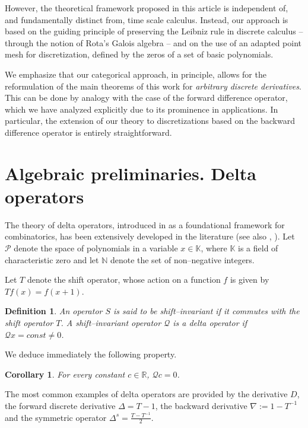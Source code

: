 \documentclass[10pt]{amsart}
\numberwithin{equation}{section}
\newtheorem{definition}{Definition}
\newtheorem{corollary}{Corollary}
\theoremstyle{definition}
\begin{document}
However, the theoretical framework proposed in this article is independent
of, and fundamentally distinct from, time scale calculus. Instead, our
approach is based on the guiding principle of preserving the Leibniz rule
in discrete calculus -- through the notion of Rota's Galois algebra -- and
on the use of an adapted point mesh for discretization, defined by the
zeros of a set of basic polynomials.

We emphasize that our categorical approach, in principle, allows for the reformulation of the main theorems of this work for
\textit{arbitrary discrete derivatives}. This can be done by analogy with
the case of the forward difference operator, which we have analyzed explicitly
due to its prominence in applications. In particular, the extension of
our theory to discretizations based on the backward difference operator
is entirely straightforward.

\section{Algebraic preliminaries. Delta operators}
\label{sec2}

The theory of delta operators, introduced in \cite{Rota} as a foundational
framework for combinatorics, has been extensively developed in the literature
(see also \cite{RR}, \cite{Roman}). Let $\mathcal{P}$ denote the space
of polynomials in a variable $x\in \mathbb{K}$, where $\mathbb{K}$ is a
field of characteristic zero and let $\mathbb{N}$ denote the set of non--negative
integers.

Let $T$ denote the shift operator, whose action on a function $f$ is given
by $T f\left (x\right )=f\left (x+1\right )$.

\begin{definition}
\label{deltaop}
An operator $S$ is said to be \textit{shift--invariant} if it commutes with
the shift operator $T$. A shift--invariant operator $\mathcal{Q}$ is a
\textit{delta operator} if $\mathcal{Q} x=const\neq 0$.
\end{definition}
We deduce immediately the following property.
\begin{corollary}
\label{cor1}
For every constant $c\in \mathbb{R}$, $\mathcal{Q} c=0$.
\end{corollary}
The most common examples of delta operators are provided by the derivative
$D$, the forward discrete derivative $\Delta =T-1$, the backward derivative
$\nabla :=1-T^{-1}$ and the symmetric operator
$\Delta ^{s}=\frac{T-T^{-1}}{2}$.
\end{document}
